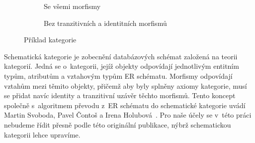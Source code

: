 \begin{figure}[!htb]
  \centering
  \begin{subfigure}{.4\textwidth}
    \centering
    \caption{Se všemi morfismy}%
    \label{fig:category-example-all}
  \end{subfigure}
  \begin{subfigure}{.4\textwidth}
    \centering
    \caption{Bez tranzitivních a identitních morfismů}%
    \label{fig:category-example-no-deduced}
  \end{subfigure}%
  \caption{Příklad kategorie}%
  \label{fig:category-example}%
\end{figure}

Schematická kategorie je zobecnění databázových schémat založená na teorii kategorií.
Jedná se o~kategorii, jejíž objekty odpovídají jednotlivým entitním typům, atributům a vztahovým typům ER schématu.
Morfismy odpovídají vztahům mezi těmito objekty, přičemž aby byly splněny axiomy kategorie, musí se přidat navíc identity a tranzitivní uzávěr těchto morfismů.
Tento koncept společně s~algoritmem převodu z~ER schématu do schematické kategorie uvádí Martin Svoboda, Pavel Čontoš a Irena Holubová~\cite{svoboda_categorical_2021}.
Pro naše účely se v~této práci nebudeme řídit přesně podle této originální publikace, nýbrž schematickou kategorii lehce upravíme.

